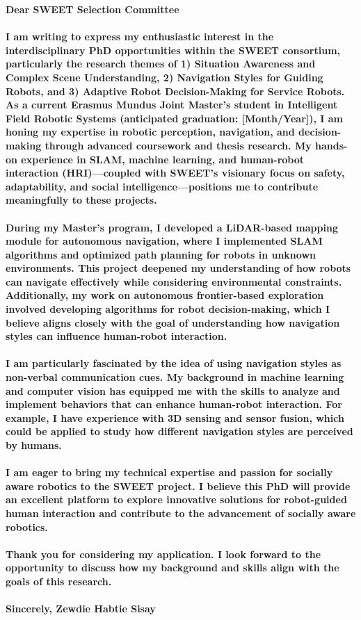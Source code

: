 \textbf{Dear SWEET Selection Committee}

\paragraph{
\textnormal{
I am writing to express my enthusiastic interest in the interdisciplinary PhD opportunities within the SWEET consortium, particularly the research themes of 1) Situation Awareness and Complex Scene Understanding, 2) Navigation Styles for Guiding Robots, and 3) Adaptive Robot Decision-Making for Service Robots. As a current Erasmus Mundus Joint Master’s student in Intelligent Field Robotic Systems (anticipated graduation: [Month/Year]), I am honing my expertise in robotic perception, navigation, and decision-making through advanced coursework and thesis research. My hands-on experience in SLAM, machine learning, and human-robot interaction (HRI)—coupled with SWEET’s visionary focus on safety, adaptability, and social intelligence—positions me to contribute meaningfully to these projects.}}

\paragraph{\textnormal{
During my Master’s program, I developed a LiDAR-based mapping module for autonomous navigation, where I implemented SLAM algorithms and optimized path planning for robots in unknown environments. This project deepened my understanding of how robots can navigate effectively while considering environmental constraints. Additionally, my work on autonomous frontier-based exploration involved developing algorithms for robot decision-making, which I believe aligns closely with the goal of understanding how navigation styles can influence human-robot interaction.
}}

\paragraph{\textnormal{
I am particularly fascinated by the idea of using navigation styles as non-verbal communication cues. My background in machine learning and computer vision has equipped me with the skills to analyze and implement behaviors that can enhance human-robot interaction. For example, I have experience with 3D sensing and sensor fusion, which could be applied to study how different navigation styles are perceived by humans.
}}

\paragraph{
\textnormal{
I am eager to bring my technical expertise and passion for socially aware robotics to the SWEET project. I believe this PhD will provide an excellent platform to explore innovative solutions for robot-guided human interaction and contribute to the advancement of socially aware robotics.
}}

\paragraph{\textnormal{
Thank you for considering my application. I look forward to the opportunity to discuss how my background and skills align with the goals of this research.
}}
\paragraph{\textnormal{
Sincerely,
Zewdie Habtie Sisay
}}
